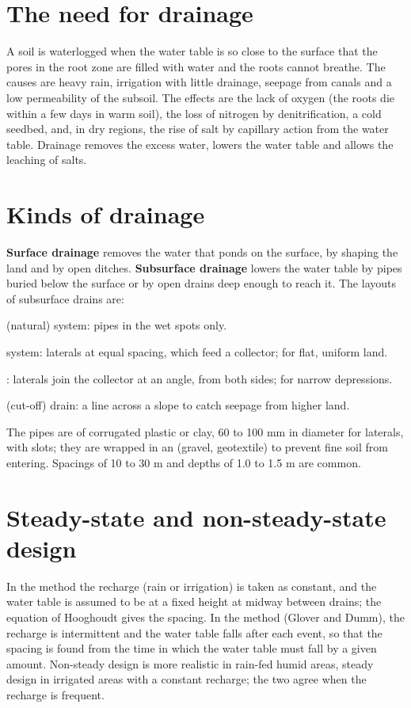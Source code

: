 \section{The need for drainage}
A soil is waterlogged when the water table is so close to the surface that the pores in the root zone are filled with water and the roots cannot breathe. The causes are heavy rain, irrigation with little drainage, seepage from canals and a low permeability of the subsoil. The effects are the lack of oxygen (the roots die within a few days in warm soil), the loss of nitrogen by denitrification, a cold seedbed, and, in dry regions, the rise of salt by capillary action from the water table. Drainage removes the excess water, lowers the water table and allows the leaching of salts.

\section{Kinds of drainage}
\textbf{Surface drainage} removes the water that ponds on the surface, by shaping the land and by open ditches. \textbf{Subsurface drainage} lowers the water table by pipes buried below the surface or by open drains deep enough to reach it. The layouts of subsurface drains are:
\begin{exlist}
\item {} (natural) system: pipes in the wet spots only.
\item {} system: laterals at equal spacing, which feed a collector; for flat, uniform land.
\item {}: laterals join the collector at an angle, from both sides; for narrow depressions.
\item {} (cut-off) drain: a line across a slope to catch seepage from higher land.
\end{exlist}
The pipes are of corrugated plastic or clay, 60 to 100 mm in diameter for laterals, with slots; they are wrapped in an  (gravel, geotextile) to prevent fine soil from entering. Spacings of 10 to 30 m and depths of 1.0 to 1.5 m are common.

\section{Steady-state and non-steady-state design}
In the  method the recharge (rain or irrigation) is taken as constant, and the water table is assumed to be at a fixed height at midway between drains; the equation of Hooghoudt gives the spacing. In the  method (Glover and Dumm), the recharge is intermittent and the water table falls after each event, so that the spacing is found from the time in which the water table must fall by a given amount. Non-steady design is more realistic in rain-fed humid areas, steady design in irrigated areas with a constant recharge; the two agree when the recharge is frequent.

